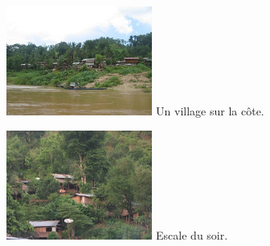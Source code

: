 \begin{multicols}{2}
\hspace*{-0.65cm}
\includegraphics[width=4.8cm]{articles/Mekong/1214473400ezNu.jpg}
Un village sur la côte.

\hspace*{-0.65cm}
\includegraphics[width=4.8cm]{articles/Mekong/1214473407uNUm.jpg}
Escale du soir.

\end{multicols}


